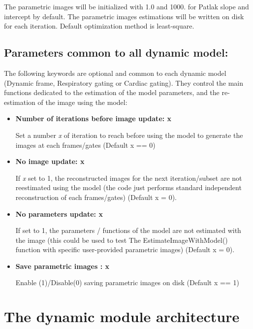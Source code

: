 \documentclass[a4paper, 11pt]{article}
\begin{document}
The parametric images will be initialized with 1.0 and 1000. for Patlak slope and intercept by default. The parametric images estimations will be written on disk for each iteration. Default optimization method is least-square.
      
   
   
  
\subsection{Parameters common to all dynamic model:} 
\label{ss_common_parameters}

The following keywords are optional and common to each dynamic model (Dynamic frame, Respiratory gating or Cardiac gating). They control the main functions dedicated to the estimation of the model parameters, and the re-estimation of the image using the model:

\begin{itemize}
\item \textbf{Number of iterations before image update: x}  

Set a number \textit{x} of iteration to reach before using the model to generate the images at each frames/gates (Default x ==  0) 
   
\item \textbf{No image update: x } 

If \textit{x} set to 1, the reconstructed images for the next iteration/subset are not reestimated using the model (the code just performs standard independent reconstruction of each frames/gates) (Default x = 0).       
          
\item \textbf{No parameters update: x} 

If set to 1, the parameters / functions of the model are not estimated with the image (this could be used to test The EstimateImageWithModel() function with specific user-provided parametric images) (Default x = 0).
   
\item \textbf{Save parametric images : x } 

Enable (1)/Disable(0) saving parametric images on disk (Default x == 1)  
\end{itemize}




\clearpage
\section{The dynamic module architecture}
\end{document}
